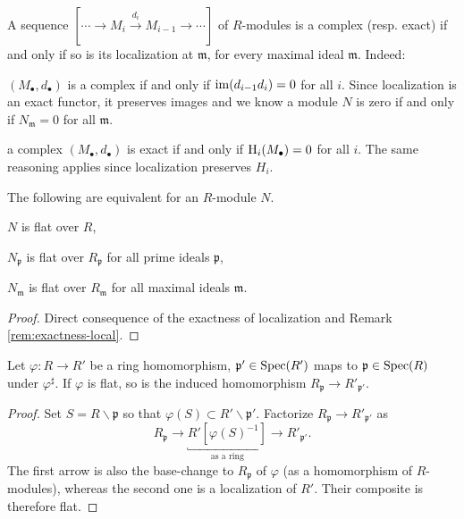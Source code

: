 \begin{remark}\label{rem:exactness-local}
	A sequence $[ \cdots \to M_i \xrightarrow{d_i} M_{i-1} \to \cdots]$ of $R$-modules is a complex (resp. exact) if and only if so is its localization at $\mathfrak{m}$, for every maximal ideal $\mathfrak{m}$. Indeed:
	\begin{compactitem}
		\item $(M_\bullet, d_\bullet)$ is a complex if and only if $\operatorname{im}(d_{i-1}d_i)=0$ for all $i$. Since localization is an exact functor, it preserves images and we know a module $N$ is zero if and only if $N_{\mathfrak{m}}=0$ for all $\mathfrak{m}$.
		\item a complex $(M_\bullet, d_\bullet)$ is exact if and only if $\operatorname{H}_i(M_\bullet)=0$ for all $i$. The same reasoning applies since localization preserves $H_i$.
	\end{compactitem}
\end{remark}

\begin{proposition}
	The following are equivalent for an $R$-module $N$.
	\begin{inparaenum}[(i)]
		\item $N$ is flat over $R$,
		\item $N_{\mathfrak{p}}$ is flat over $R_{\mathfrak{p}}$ for all prime ideals $\mathfrak{p}$,
		\item $N_{\mathfrak{m}}$ is flat over $R_{\mathfrak{m}}$ for all maximal ideals $\mathfrak{m}$.
	\end{inparaenum}
\end{proposition}
\begin{proof}
	Direct consequence of the exactness of localization and Remark \ref{rem:exactness-local}.
\end{proof}

\begin{lemma}\label{prop:flat-ring-localizations}
	Let $\varphi: R \to R'$ be a ring homomorphism, $\mathfrak{p}' \in \operatorname{Spec}(R')$ maps to $\mathfrak{p} \in \operatorname{Spec}(R)$ under $\varphi^\sharp$. If $\varphi$ is flat, so is the induced homomorphism $R_{\mathfrak{p}} \to R'_{\mathfrak{p}'}$.
\end{lemma}
\begin{proof}
	Set $S = R \smallsetminus \mathfrak{p}$ so that $\varphi(S) \subset R' \smallsetminus \mathfrak{p}'$. Factorize $R_{\mathfrak{p}} \to R'_{\mathfrak{p}'}$ as
	\[ R_{\mathfrak{p}} \to \underbracket{R'[\varphi(S)^{-1}]}_{\text{as a ring}} \to R'_{\mathfrak{p}'}. \]
	The first arrow is also the base-change to $R_{\mathfrak{p}}$ of $\varphi$ (as a homomorphism of $R$-modules), whereas the second one is a localization of $R'$. Their composite is therefore flat.
\end{proof}

